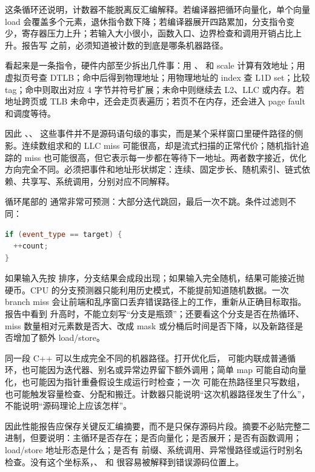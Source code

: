 这条循环还说明，计数器不能脱离反汇编解释。若编译器把循环向量化，单个向量 load 会覆盖多个元素，退休指令数下降；若编译器展开四路累加，分支指令变少，寄存器压力上升；若输入大小很小，函数入口、边界检查和调用开销占比上升。报告写  之前，必须知道被计数的到底是哪条机器路径。

 看起来是一条指令，硬件内部至少拆出几件事：用 、 和 scale 计算有效地址；用虚拟页号查 DTLB；命中后得到物理地址；用物理地址的 index 查 L1D set；比较 tag；命中则取出对应 4 字节并符号扩展；未命中则继续去 L2、LLC 或内存。若地址跨页或 TLB 未命中，还会走页表遍历；若页不在内存，还会进入 page fault 和调度等待。

因此 、、 这些事件并不是源码语句级的事实，而是某个采样窗口里硬件路径的侧影。连续数组求和的 LLC miss 可能很高，却是流式扫描的正常代价；随机指针追踪的 miss 也可能很高，但它表示每一步都在等待下一地址。两者数字接近，优化方向完全不同。必须把事件和地址形状绑定：连续、固定步长、随机索引、链式依赖、共享写、系统调用，分别对应不同解释。

循环尾部的  通常非常可预测：大部分迭代跳回，最后一次不跳。条件过滤则不同：

\begin{lstlisting}[language=C++,caption={可预测性取决于输入分布的分支}]
if (event_type == target) {
  ++count;
}
\end{lstlisting}

如果输入先按  排序，分支结果会成段出现；如果输入完全随机，结果可能接近抛硬币。CPU 的分支预测器只能利用历史模式，不能提前知道随机数据。一次 branch miss 会让前端和乱序窗口丢弃错误路径上的工作，重新从正确目标取指。报告中看到  升高时，不能立刻写“分支是瓶颈”；还要看这个分支是否在热循环、miss 数量相对元素数是否大、改成 mask 或分桶后时间是否下降，以及新路径是否增加了额外 load/store。

同一段 C++ 可以生成完全不同的机器路径。打开优化后， 可能内联成普通循环，也可能因为迭代器、别名或异常边界留下额外调用；简单 map 可能自动向量化，也可能因为指针重叠假设生成运行时检查；一次  可能在热路径里只写数组，也可能触发容量检查、分配和搬迁。计数器只能说明“这次机器路径发生了什么”，不能说明“源码理论上应该怎样”。

因此性能报告应保存关键反汇编摘要，而不是只保存源码片段。摘要不必贴完整二进制，但要说明：主循环是否存在；是否向量化；是否展开；是否有函数调用；load/store 地址形态是什么；是否有  前缀、系统调用、异常慢路径或运行时别名检查。没有这个坐标系，、 和  很容易被解释到错误源码位置上。

